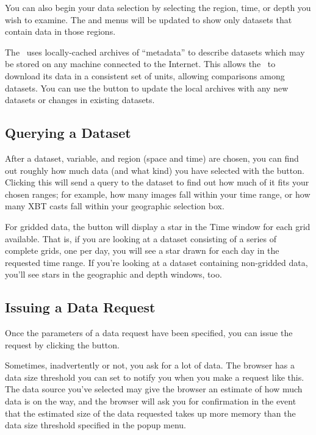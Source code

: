 You can also begin your data selection by selecting the region, time,
or depth you wish to examine. The  and 
menus will be updated to show only datasets that contain data in those
regions.

The \GUI\ uses locally-cached archives of ``metadata'' to
describe datasets which may be stored on any machine connected to the
Internet. This allows the \GUI\ to download its data in a consistent
set of units, allowing comparisons among datasets.
You can use the  button to
update the local archives with any new datasets or changes in existing
datasets.

\subsection{Querying a Dataset}

After a dataset, variable, and region (space and time) are chosen, you
can find out roughly how much data (and what kind) you have selected with the
 button. Clicking this will send a query to the
dataset to find out how much of it fits your chosen ranges; for
example, how many images fall within your time range, or how many XBT
casts fall within your geographic selection box.

For gridded data, the  button will display a star in
the Time window for each grid available.  That is, if you are looking
at a dataset consisting of a series of complete grids, one per day,
you will see a star drawn for each day in the requested time range.
If you're looking at a dataset containing non-gridded data, you'll see
stars in the geographic and depth windows, too.

\subsection{Issuing a Data Request}

Once the parameters of a data request have been specified, you can
issue the request by clicking the  button.  

Sometimes, inadvertently or not, you ask for a lot of data.  The
browser has a data size threshold you can set to notify you when you
make a request like this.  The data source you've selected may give 
the browser an estimate of how much data is on the way, and the
browser will ask you for confirmation in the event that the estimated
size of the data requested takes up more memory than the data size
threshold specified in the  popup
menu. 

